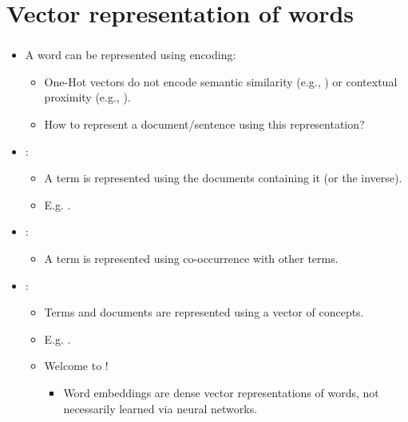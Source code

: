 \documentclass[xcolor=table]{beamer}
\begin{document}
\section{Vector representation of words}

\begin{frame}
	\frametitle{\insertshortsubtitle}
	\framesubtitle{\insertsection}

	\begin{itemize}
		\item A word can be represented using  encoding:
		\begin{itemize}
			\item One-Hot vectors do not encode semantic similarity (e.g., ) or contextual proximity (e.g., ).
			\item How to represent a document/sentence using this representation?
		\end{itemize}
	
		\item {}:
		\begin{itemize}
			\item A term is represented using the documents containing it (or the inverse).
			\item E.g. .
		\end{itemize}
	
		\item {}:
		\begin{itemize}
			\item A term is represented using co-occurrence with other terms.
		\end{itemize}
	
		\item {}:
		\begin{itemize}
			\item Terms and documents are represented using a vector of concepts.
			\item E.g. .
			\item Welcome to !
			\begin{itemize}
				\item Word embeddings are dense vector representations of words, not necessarily learned via neural networks.
			\end{itemize}
		\end{itemize}
	
	\end{itemize}

\end{frame}
\end{document}
